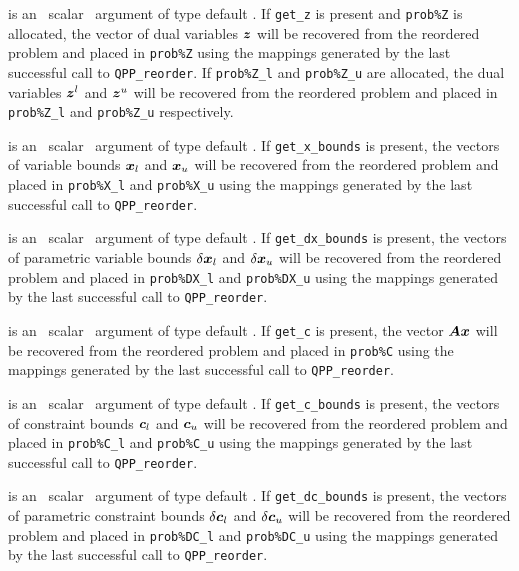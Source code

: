 \documentclass{galahad}
\newcommand{\packagename}{QPP}
\begin{document}
\begin{description}
is an \optional\ scalar \intentin\ argument of type default \logical. 
If {\tt get\_z} is present and {\tt prob\%Z} is allocated, 
the vector of dual variables ${\bm{z}}$
will be recovered from  the reordered problem and placed in {\tt prob\%Z} 
using the mappings generated by the last successful call to 
{\tt \packagename\_reorder}. If {\tt prob\%Z\_l} and {\tt prob\%Z\_u} 
are allocated, the dual variables
${\bm{z}}^l$ and ${\bm{z}}^u$ will be recovered from  the reordered problem and 
placed in {\tt prob\%Z\_l} and {\tt prob\%Z\_u} respectively.
 
is an \optional\ scalar \intentin\ argument of type default \logical. 
If {\tt get\_x\_bounds} is present, 
the vectors of variable bounds ${\bm{x}}_l$ and ${\bm{x}}_u$
will be recovered from  the reordered problem and placed in {\tt prob\%X\_l} 
and {\tt prob\%X\_u} using the mappings generated by the last successful 
call to {\tt \packagename\_reorder}. 
 
is an \optional\ scalar \intentin\ argument of type default \logical. 
If {\tt get\_dx\_bounds} is present, 
the vectors of parametric variable bounds $\delta {\bm{x}}_l$ and 
$\delta {\bm{x}}_u$
will be recovered from  the reordered problem and placed in {\tt prob\%DX\_l} 
and {\tt prob\%DX\_u} using the mappings generated by the last successful 
call to {\tt \packagename\_reorder}. 

is an \optional\ scalar \intentin\ argument of type default \logical. 
If {\tt get\_c} is present, the vector ${\bm{A}} {\bm{x}}$ 
will be recovered from  the reordered problem and placed in {\tt prob\%C} 
using the mappings generated by the last successful call to 
{\tt \packagename\_reorder}. 
 
is an \optional\ scalar \intentin\ argument of type default \logical. 
If {\tt get\_c\_bounds} is present, 
the vectors of constraint bounds ${\bm{c}}_l$ and 
${\bm{c}}_u$
will be recovered from  the reordered problem and placed in {\tt prob\%C\_l} 
and {\tt prob\%C\_u} using the mappings generated by the last successful 
call to {\tt \packagename\_reorder}. 
 
is an \optional\ scalar \intentin\ argument of type default \logical. 
If {\tt get\_dc\_bounds} is present, 
the vectors of parametric constraint bounds $\delta {\bm{c}}_l$ and $\delta {\bm{c}}_u$
will be recovered from  the reordered problem and placed in {\tt prob\%DC\_l} 
and {\tt prob\%DC\_u} using the mappings generated by the last successful 
call to {\tt \packagename\_reorder}. 
 

\end{description}
\end{document}
